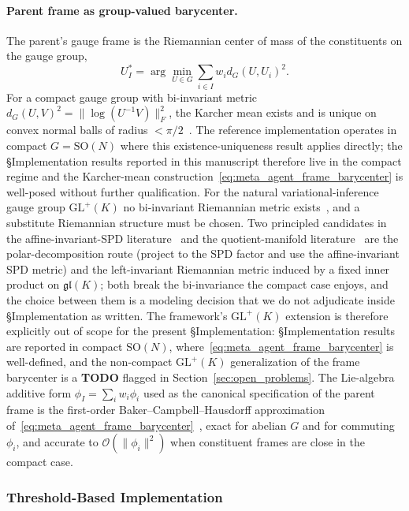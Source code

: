 \documentclass[11pt]{article}
\begin{document}
\paragraph{Parent frame as group-valued barycenter.} The parent's gauge frame is the Riemannian center of mass of the constituents on the gauge group,
\begin{equation}
U_I^* = \arg\min_{U \in G} \sum_{i \in I} w_i d_G(U, U_i)^2.
\label{eq:meta_agent_frame_barycenter}
\end{equation}
For a compact gauge group with bi-invariant metric $d_G(U, V)^2 = \|\log(U^{-1}V)\|_F^2$, the Karcher mean exists and is unique on convex normal balls of radius $< \pi/2$~\cite{Karcher1977, Pennec2009}. The reference implementation operates in compact $G = \mathrm{SO}(N)$ where this existence-uniqueness result applies directly; the §Implementation results reported in this manuscript therefore live in the compact regime and the Karcher-mean construction~\eqref{eq:meta_agent_frame_barycenter} is well-posed without further qualification. For the natural variational-inference gauge group $\mathrm{GL}^+(K)$ no bi-invariant Riemannian metric exists~\cite{Milnor1976}, and a substitute Riemannian structure must be chosen. Two principled candidates in the affine-invariant-SPD literature~\cite{PennecFillardAyache2006} and the quotient-manifold literature~\cite{BonnabelSepulchre2009} are the polar-decomposition route (project to the SPD factor and use the affine-invariant SPD metric) and the left-invariant Riemannian metric induced by a fixed inner product on $\mathfrak{gl}(K)$; both break the bi-invariance the compact case enjoys, and the choice between them is a modeling decision that we do not adjudicate inside §Implementation as written. The framework's $\mathrm{GL}^+(K)$ extension is therefore explicitly out of scope for the present §Implementation: §Implementation results are reported in compact $\mathrm{SO}(N)$, where~\eqref{eq:meta_agent_frame_barycenter} is well-defined, and the non-compact $\mathrm{GL}^+(K)$ generalization of the frame barycenter is a \textbf{TODO} flagged in Section~\ref{sec:open_problems}. The Lie-algebra additive form $\phi_I = \sum_i w_i \phi_i$ used as the canonical specification of the parent frame is the first-order Baker--Campbell--Hausdorff approximation of~\eqref{eq:meta_agent_frame_barycenter}~\cite{Hall2015}, exact for abelian $G$ and for commuting $\phi_i$, and accurate to $\mathcal{O}(\|\phi_i\|^2)$ when constituent frames are close in the compact case.

\subsubsection{Threshold-Based Implementation}
\label{sec:meta_agent_threshold}
\end{document}
